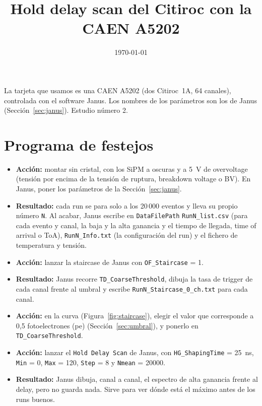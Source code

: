 \documentclass[11pt,a4paper]{article}
\title{Hold delay scan del Citiroc con la CAEN A5202}
\author{}
\date{\today}
\begin{document}
\maketitle

\noindent La tarjeta que usamos es una CAEN A5202 (dos Citiroc~1A, 64 canales),
controlada con el software Janus. Los nombres de los parámetros son los de
Janus (Sección~\ref{sec:janus}). Estudio número 2.

\section*{Programa de festejos}

\begin{itemize}
\item {\bf Acción:} montar sin cristal, con los SiPM a oscuras y a 5~V de overvoltage (tensión por encima de la
  tensión de ruptura, breakdown voltage o BV). En Janus, poner los
  parámetros de la Sección~\ref{sec:janus}.
\item {\bf Resultado:} cada run se para solo a los 20\,000 eventos y lleva su
  propio número \texttt{N}. Al acabar, Janus escribe en \texttt{DataFilePath}
  \texttt{RunN\_list.csv} (para cada evento y canal, la baja y la alta
  ganancia y el tiempo de llegada, time of arrival o ToA),
  \texttt{RunN\_Info.txt} (la configuración del run) y el fichero de
  temperatura y tensión.
\end{itemize}

\begin{itemize}
\item {\bf Acción:} lanzar la staircase de Janus con \texttt{OF\_Staircase} = 1.
\item {\bf Resultado:} Janus recorre \texttt{TD\_CoarseThreshold}, dibuja la
  tasa de trigger de cada canal frente al umbral y escribe
  \texttt{RunN\_Staircase\_0\_ch.txt} para cada canal.
\item {\bf Acción:} en la curva (Figura~\ref{fig:staircase}), elegir el valor
  que corresponde a 0,5 fotoelectrones (pe) (Sección~\ref{sec:umbral}), y
  ponerlo en \texttt{TD\_CoarseThreshold}.
\end{itemize}

\begin{itemize}
\item {\bf Acción:} lanzar el \texttt{Hold Delay Scan} de Janus, con
  \texttt{HG\_ShapingTime} = 25~ns, \texttt{Min} = 0, \texttt{Max} = 120, \texttt{Step} = 8 y \texttt{Nmean} =
  20000.
\item {\bf Resultado:} Janus dibuja, canal a canal, el espectro de alta
  ganancia frente al delay, pero no guarda nada. Sirve para ver dónde está
  el máximo antes de los runs buenos.
\end{itemize}
\end{document}
